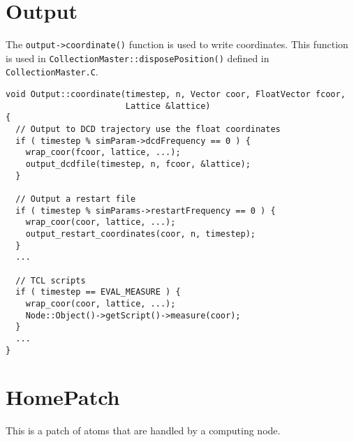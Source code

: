 \documentclass{article}
\begin{document}
\section{Output}

The \texttt{output->coordinate()} function is used to write coordinates.
%
This function is used in \texttt{CollectionMaster::disposePosition()}
defined in \texttt{CollectionMaster.C}.

\begin{lstlisting}
void Output::coordinate(timestep, n, Vector coor, FloatVector fcoor,
                        Lattice &lattice)
{
  // Output to DCD trajectory use the float coordinates
  if ( timestep % simParam->dcdFrequency == 0 ) {
    wrap_coor(fcoor, lattice, ...);
    output_dcdfile(timestep, n, fcoor, &lattice);
  }

  // Output a restart file
  if ( timestep % simParams->restartFrequency == 0 ) {
    wrap_coor(coor, lattice, ...);
    output_restart_coordinates(coor, n, timestep);
  }
  ...

  // TCL scripts
  if ( timestep == EVAL_MEASURE ) {
    wrap_coor(coor, lattice, ...);
    Node::Object()->getScript()->measure(coor);
  }
  ...
}
\end{lstlisting}


\section{HomePatch}

This is a patch of atoms that are handled by a computing node.







%
%
\end{document}
